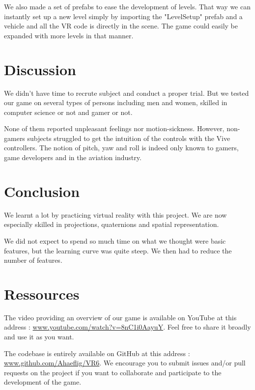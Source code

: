 \documentclass[12pt]{article}
\begin{document}
We also made a set of prefabs to ease the development of levels. That way we can instantly set up a new level simply by importing the "LevelSetup" prefab and a vehicle and all the VR code is directly in the scene. The game could easily be expanded with more levels in that manner.


\section{Discussion}

We didn't have time to recrute subject and conduct a proper trial. But we tested our game on several types of persons including men and women, skilled in computer science or not and gamer or not.

None of them reported unpleasant feelings nor motion-sickness. However, non-gamers subjects struggled to get the intuition of the controls with the Vive controllers. The notion of pitch, yaw and roll is indeed only known to gamers, game developers and in the aviation industry.

\section{Conclusion}

We learnt a lot by practicing virtual reality with this project. We are now especially skilled in projections, quaternions and spatial representation.

We did not expect to spend so much time on what we thought were basic features, but the learning curve was quite steep. We then had to reduce the number of features.

\section{Ressources}

The video providing an overview of our game is available on YouTube at this address : \href{https://www.youtube.com/watch?v=8nC1i0AayuY}{www.youtube.com/watch?v=8nC1i0AayuY}. Feel free to share it broadly and use it as you want.

The codebase is entirely available on GitHub at this address : \href{https://github.com/Ahaeflig/VR6}{www.github.com/Ahaeflig/VR6}. We encourage you to submit issues and/or pull requests on the project if you want to collaborate and participate to the development of the game.
\end{document}
